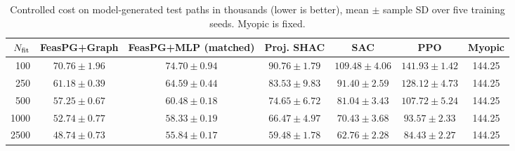 \begin{table}[ht]
\caption{Controlled cost on model-generated test paths in thousands (lower is better), mean
$\pm$ sample SD over five training seeds.  Myopic is fixed.}
\label{tab:budget-complete}
\centering
\scriptsize
\setlength{\tabcolsep}{2.7pt}
\begin{tabular}{@{}rcccccc@{}}
\toprule
$N_{\rm fit}$ & FeasPG+Graph & FeasPG+MLP (matched) & Proj. SHAC & SAC & PPO & Myopic\\
\midrule
100  & $70.76\pm1.96$ & $74.70\pm0.94$ & $90.76\pm1.79$ & $109.48\pm4.06$ & $141.93\pm1.42$ & 144.25\\
250  & $61.18\pm0.39$ & $64.59\pm0.44$ & $83.53\pm9.83$ & $91.40\pm2.59$ & $128.12\pm4.73$ & 144.25\\
500  & $57.25\pm0.67$ & $60.48\pm0.18$ & $74.65\pm6.72$ & $81.04\pm3.43$ & $107.72\pm5.24$ & 144.25\\
1000 & $52.74\pm0.77$ & $58.33\pm0.19$ & $66.47\pm4.97$ & $70.43\pm3.68$ & $93.57\pm2.33$ & 144.25\\
2500 & $48.74\pm0.73$ & $55.84\pm0.17$ & $59.48\pm1.78$ & $62.76\pm2.28$ & $84.43\pm2.27$ & 144.25\\
\bottomrule
\end{tabular}
\end{table}
